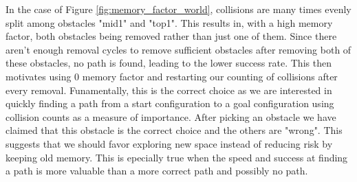 In the case of Figure \ref{fig:memory_factor_world}, collisions are many times evenly split among obstacles "mid1" and "top1". This results in, with a high memory factor, both obstacles being removed rather than just one of them. Since there aren't enough removal cycles to remove sufficient obstacles after removing both of these obstacles, no path is found, leading to the lower success rate. This then motivates using 0 memory factor and restarting our counting of collisions after every removal. Funamentally, this is the correct choice as we are interested in quickly finding a path from a start configuration to a goal configuration using collision counts as a measure of importance. After picking an obstacle we have claimed that this obstacle is the correct choice and the others are "wrong". This suggests that we should favor exploring new space instead of reducing risk by keeping old memory. This is epecially true when the speed and success at finding a path is more valuable than a more correct path and possibly no path.



